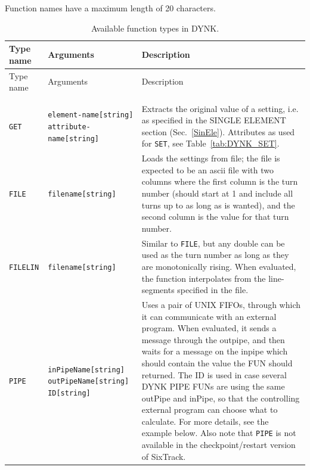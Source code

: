 Function names have a maximum length of 20 characters.

\begin{center}
\small
\begin{longtable}{|p{1.8cm} | p{4.1cm} | p{9.5cm}|}
    \caption{Available function types in DYNK.}
    \label{tab:DYNK_FUN} \\*
    \hline
    \rowcolor{blue!30}
    Type name & Arguments & Description \\*
    \hline
    \endfirsthead

    \hline
    \rowcolor{blue!30}
    Type name & Arguments & Description \\*
    \endhead

    \rowcolor{gray!15}
    \multicolumn{3}{|c|}{(The table continues on the next page)}\\*
    \hline
    \endfoot

    \hline
    \endlastfoot

    \rowcolor{blue!15}
    \multicolumn{3}{|l|}{``System'' functions} \\*
    \hline

    \texttt{GET} & \texttt{element-name[string] attribute-name[string]} &
    Extracts the original value of a setting, i.e. as specified in the SINGLE ELEMENT section (Sec.~\ref{SinEle}). Attributes as used for \texttt{SET}, see Table~\ref{tab:DYNK_SET}. \\*
    \hline

    \texttt{FILE} & \texttt{filename[string]} &
    Loads the settings from file; the file is expected to be an ascii file with two columns where the first column is the turn number (should start at 1 and include all turns up to as long as is wanted), and the second column is the value for that turn number.\\*
    \hline

    \texttt{FILELIN} & \texttt{filename[string]} &
    Similar to \texttt{FILE}, but any double can be used as the turn number as long as they are monotonically rising.
    When evaluated, the function interpolates from the line-segments specified in the file. \\*
    \hline

    \texttt{PIPE} & \texttt{inPipeName[string] outPipeName[string] ID[string]} &
    Uses a pair of UNIX FIFOs, through which it can communicate with an external program.
    When evaluated, it sends a message through the outpipe, and then waits for a message on the inpipe which should contain the value the FUN should returned.
    The ID is used in case several DYNK PIPE FUNs are using the same outPipe and inPipe, so that the controlling external program can choose what to calculate.
    For more details, see the example below.
    Also note that \texttt{PIPE} is not available in the checkpoint/restart version of SixTrack.\\*
    \hline


\end{longtable}
\end{center}
